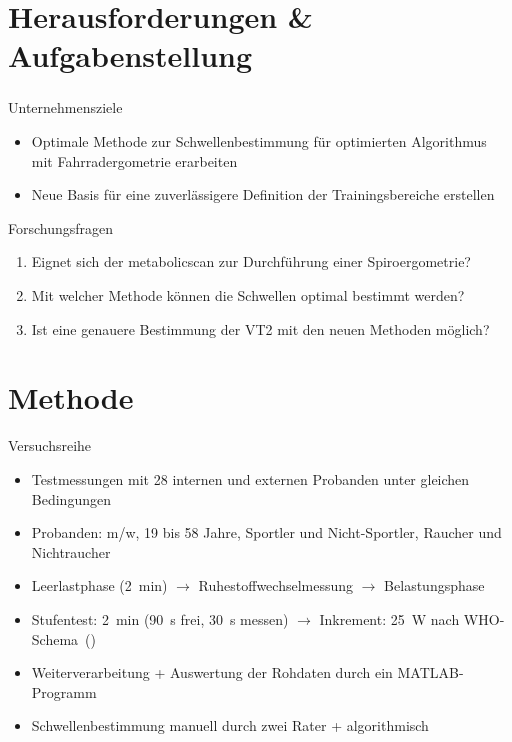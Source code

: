 \documentclass[colorBG,slideColor,8pt]{beamer}
\let\oldframetitle\frametitle%
\renewcommand{\frametitle}[1]{%
	\oldframetitle{#1}\setstretch{1.5}}
\begin{document}

\section{Herausforderungen \& Aufgabenstellung}

\begin{frame}
\frametitle{}
\begin{block}{Unternehmensziele}
	\begin{itemize}
		\item Optimale Methode zur Schwellenbestimmung für optimierten Algorithmus mit Fahrradergometrie erarbeiten
		\item Neue Basis für eine zuverlässigere Definition der Trainingsbereiche erstellen
	\end{itemize}
\end{block}
\begin{block}{Forschungsfragen}
	\begin{enumerate}
		\item Eignet sich der metabolicscan zur Durchführung einer Spiroergometrie?
		\item Mit welcher Methode können die Schwellen optimal bestimmt werden?
		\item Ist eine genauere Bestimmung der VT2 mit den neuen Methoden möglich?
	\end{enumerate}
\end{block}
\end{frame}

\section{Methode}

\begin{frame}{Versuchsreihe}
\begin{itemize}
	\item Testmessungen mit 28 internen und externen Probanden unter gleichen Bedingungen
	\item Probanden: m/w, 19 bis 58 Jahre, Sportler und Nicht-Sportler, Raucher und Nichtraucher
	\item Leerlastphase (\SI{2}{\minute}) $\rightarrow$ Ruhestoffwechselmessung $\rightarrow$ Belastungsphase
	\item Stufentest: \SI{2}{\minute} (\SI{90}{\second} frei, \SI{30}{\second} messen) $\rightarrow$ Inkrement: \SI{25}{\watt} nach WHO-Schema~(\cite{Trappe.2000})
	\item Weiterverarbeitung + Auswertung der Rohdaten durch ein MATLAB-Programm
	\item Schwellenbestimmung manuell durch zwei Rater + algorithmisch
\end{itemize}
\end{frame}
\end{document}
